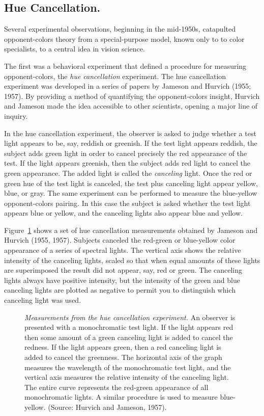 \subsection*{Hue Cancellation. }
Several experimental observations, beginning in the mid-1950s, catapulted
opponent-colors theory from a special-purpose model, known only to
to color specialists, to a central idea in vision science.

The first was a behavioral experiment that defined a procedure for
measuring opponent-colors, the {\em hue cancellation} experiment.  The
hue cancellation experiment was developed in a series of papers by
Jameson and Hurvich (1955; 1957).  By providing a method of
quantifying the opponent-colors insight, Hurvich and Jameson made the
idea accessible to other scientists, opening a major line of inquiry.

In the hue cancellation experiment, the observer is asked to judge
whether a test light appears to be, say, reddish or greenish.  If the
test light appears reddish, the subject adds green light in order to
cancel precisely the red appearance of the test.  If the light appears
greenish, then the subject adds red light to cancel the green
appearance.  The added light is called the {\em canceling} light.
Once the red or green hue of the test light is canceled, the test
plus canceling light appear yellow, blue, or gray.  The same
experiment can be performed to measure the blue-yellow opponent-colors
pairing.  In this case the subject is asked whether the test light
appears blue or yellow, and the canceling lights also appear blue and
yellow.

Figure~\ref{f8:hueCancel} shows a set of hue cancellation measurements
obtained by Jameson and Hurvich (1955, 1957).  Subjects canceled the
red-green or blue-yellow color appearance of a series of spectral
lights.  The vertical axis shows the relative intensity of the
canceling lights, scaled so that when equal amounts of these lights
are superimposed the result did not appear, say, red or green.  The
canceling lights always have positive intensity, but the intensity of
the green and blue canceling lights are plotted as negative to permit
you to distinguish which canceling light was used.
\begin{figure}
\centerline{
  }
\caption[Hue Cancellation]{ {\em Measurements from the hue
cancellation experiment.} An observer is presented with a
monochromatic test light.  If the light appears red then some amount
of a green canceling light is added to cancel the redness.  If the
light appears green, then a red canceling light is added to cancel
the greenness.  The horizontal axis of the graph measures the
wavelength of the monochromatic test light, and the vertical axis
measures the relative intensity of the canceling light.  The entire
curve represents the red-green appearance of all monochromatic
lights.  A similar procedure is used to measure blue-yellow.
(Source: Hurvich and Jameson, 1957).  
}
\label{f8:hueCancel} \end{figure}

